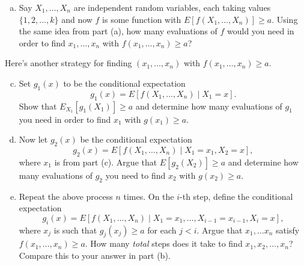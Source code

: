 \documentclass[11pt,letterpaper]{article}
\begin{document}
\begin{enumerate}
\begin{enumerate}[(a)]
        \item Say $X_1, \ldots, X_n$ are independent random variables, each taking values $\{1, 2, \ldots, k\}$ and now $f$ is some function with $E[f(X_1, \ldots, X_n)] \geq a$.
        Using the same idea from part (a), how many evaluations of $f$ would you need in order to find $x_1, \ldots, x_n$ with $f(x_1, \ldots, x_n) \geq a$?
    \end{enumerate}

    Here's another strategy for finding $(x_1, \ldots, x_n)$ with $f(x_1, \ldots, x_n) \geq a$.

    \begin{enumerate}[(a)]
        \setcounter{enumii}{2}
        \item Set $g_1(x)$ to be the conditional expectation
        \[
            g_1(x) = E[f(X_1, \ldots, X_n) \mid X_1 = x].
        \]
        Show that $E_{X_1}[g_1(X_1)] \geq a$ and determine how many evaluations of $g_1$ you need in order to find $x_1$ with $g(x_1) \geq a$.

        \item Now let $g_2(x)$ be the conditional expectation
        \[
            g_2(x) = E[f(X_1, \ldots, X_n) \mid X_1 = x_1, X_2 = x],
        \]
        where $x_1$ is from part (c).
        Argue that $E[g_2(X_2)] \geq a$ and determine how many evaluations of $g_2$ you need to find $x_2$ with $g(x_2) \geq a$.

        \item Repeat the above process $n$ times.
        On the $i$-th step, define the conditional expectation
        \[
            g_i(x) = E[f(X_1, \ldots, X_n) \mid X_1 = x_1, \ldots, X_{i-1} = x_{i-1}, X_i = x],
        \]
        where $x_j$ is such that $g_j(x_j) \geq a$ for each $j < i$.
        Argue that $x_1, \ldots x_n$ satisfy $f(x_1, \ldots, x_n) \geq a$.
        How many \emph{total} steps does it take to find $x_1, x_2, \ldots, x_n$?
        Compare this to your answer in part (b).
    \end{enumerate}



\end{enumerate}
\end{document}
